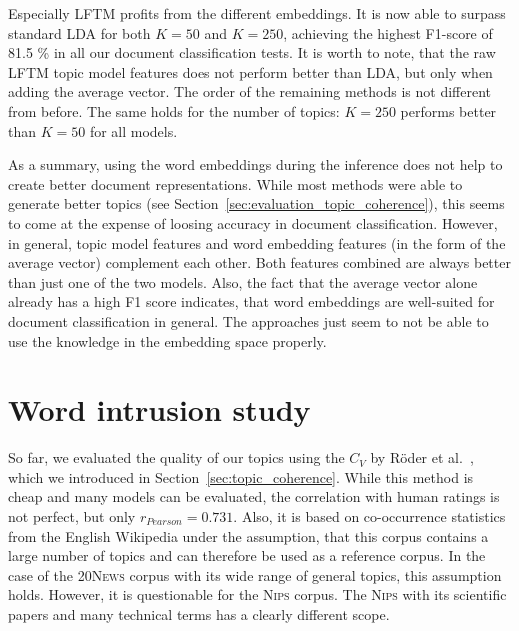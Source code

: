 \documentclass[
        a4paper,
        titlepage,
        twoside,
        parskip,
        numbers=noenddot
        ]{scrbook}
\theoremstyle{break}
\begin{document}
Especially LFTM profits from the different embeddings.
It is now able to surpass standard LDA for both $K = 50$ and $K = 250$, achieving the highest F1-score of 81.5 \% in all our document classification tests.
It is worth to note, that the raw LFTM topic model features does not perform better than LDA, but only when adding the average vector.
The order of the remaining methods is not different from before.
The same holds for the number of topics: $K = 250$ performs better than $K = 50$ for all models.

As a summary, using the word embeddings during the inference does not help to create better document representations.
While most methods were able to generate better topics (see Section~\ref{sec:evaluation_topic_coherence}), this seems to come at the expense of loosing accuracy in document classification.
However, in general, topic model features and word embedding features (in the form of the average vector) complement each other.
Both features combined are always better than just one of the two models.
Also, the fact that the average vector alone already has a high F1 score indicates, that word embeddings are well-suited for document classification in general.
The approaches just seem to not be able to use the knowledge in the embedding space properly.

\section{Word intrusion study}

So far, we evaluated the quality of our topics using the $C_V$ by Röder et al.~\cite{Roder2015}, which we introduced in Section~\ref{sec:topic_coherence}.
While this method is cheap and many models can be evaluated, the correlation with human ratings is not perfect, but only $r_{Pearson} = 0.731$.
Also, it is based on co-occurrence statistics from the English Wikipedia under the assumption, that this corpus contains a large number of topics and can therefore be used as a reference corpus.
In the case of the \textsc{20News} corpus with its wide range of general topics, this assumption holds.
However, it is questionable for the \textsc{Nips} corpus.
The \textsc{Nips} with its scientific papers and many technical terms has a clearly different scope.
\end{document}
